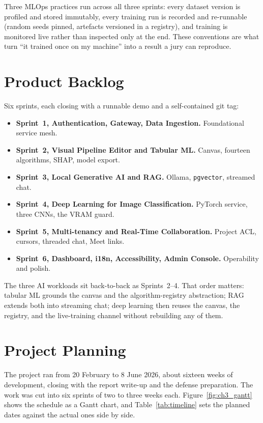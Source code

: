 \documentclass[12pt, a4paper, oneside]{report}
\begin{document}
Three MLOps practices run across all three sprints: every dataset
version is profiled and stored immutably, every training run is recorded
and re-runnable (random seeds pinned, artefacts versioned in a
registry), and training is monitored live rather than inspected only at
the end. These conventions are what turn ``it trained once on my
machine'' into a result a jury can reproduce.

\section{Product Backlog}

Six sprints, each closing with a runnable demo and a self-contained
git tag:

\begin{itemize}
    \item \textbf{Sprint~1, Authentication, Gateway, Data
        Ingestion.} Foundational service mesh.
    \item \textbf{Sprint~2, Visual Pipeline Editor and Tabular
        ML.} Canvas, fourteen algorithms, SHAP, model export.
    \item \textbf{Sprint~3, Local Generative AI and RAG.} Ollama,
        \texttt{pgvector}, streamed chat.
    \item \textbf{Sprint~4, Deep Learning for Image
        Classification.} PyTorch service, three CNNs, the VRAM
        guard.
    \item \textbf{Sprint~5, Multi-tenancy and Real-Time
        Collaboration.} Project ACL, cursors, threaded chat, Meet
        links.
    \item \textbf{Sprint~6, Dashboard, i18n, Accessibility, Admin
        Console.} Operability and polish.
\end{itemize}

The three AI workloads sit back-to-back as Sprints~2--4. That order
matters: tabular ML grounds the canvas and the algorithm-registry
abstraction; RAG extends both into streaming chat; deep learning then
reuses the canvas, the registry, and the live-training channel
without rebuilding any of them.

\section{Project Planning}

The project ran from 20 February to 8 June 2026, about sixteen
weeks of development, closing with the report write-up and the defense
preparation. The work was cut into six sprints of two to three weeks
each. Figure~\ref{fig:ch3_gantt} shows the schedule as a Gantt chart,
and Table~\ref{tab:timeline} sets the planned dates against the actual
ones side by side.
\end{document}
